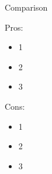 \documentclass{beamer}
\begin{document}
\begin{frame}{Comparison}
\pause
    \begin{minipage}[t]{0.48\linewidth}
%
        Pros:
\pause
        \begin{itemize}[<+->]
            \item 1
            \item 2
            \item 3
        \end{itemize}
    \end{minipage}
    \hfill
    \begin{minipage}[t]{0.48\linewidth}%
%
        Cons:
        \begin{itemize}[<+->]
            \item 1
            \item 2
            \item 3
        \end{itemize}
    \end{minipage}
\end{frame}
\end{document}
